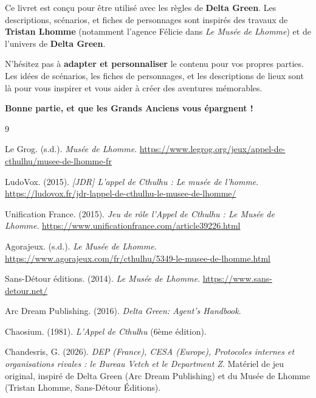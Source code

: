 \documentclass[10pt,a5paper,twoside]{book}
\begin{document}
Ce livret est conçu pour être utilisé avec les règles de \textbf{Delta Green}. Les descriptions, scénarios, et fiches de personnages sont inspirés des travaux de \textbf{Tristan Lhomme} (notamment l'agence Félicie dans \textit{Le Musée de Lhomme}) et de l'univers de \textbf{Delta Green}.

N'hésitez pas à \textbf{adapter et personnaliser} le contenu pour vos propres parties. Les idées de scénarios, les fiches de personnages, et les descriptions de lieux sont là pour vous inspirer et vous aider à créer des aventures mémorables.

\begin{shaded}
	\begin{center}
		\textbf{Bonne partie, et que les Grands Anciens vous épargnent !}
	\end{center}
\end{shaded}



\begin{thebibliography}{9}

	Le Grog. (s.d.). \textit{Musée de Lhomme}. \url{https://www.legrog.org/jeux/appel-de-cthulhu/musee-de-lhomme-fr}
	
	LudoVox. (2015). \textit{[JDR] L'appel de Cthulhu : Le musée de l'homme}. \url{https://ludovox.fr/jdr-lappel-de-cthulhu-le-musee-de-lhomme/}
	
	Unification France. (2015). \textit{Jeu de rôle l'Appel de Cthulhu : Le Musée de Lhomme}. \url{https://www.unificationfrance.com/article39226.html}
	
	Agorajeux. (s.d.). \textit{Le Musée de Lhomme}. \url{https://www.agorajeux.com/fr/cthulhu/5349-le-musee-de-lhomme.html}
	
	Sans-Détour éditions. (2014). \textit{Le Musée de Lhomme}. \url{https://www.sans-detour.net/}
	
	Arc Dream Publishing. (2016). \textit{Delta Green: Agent's Handbook}. 
	
	Chaosium. (1981). \textit{L'Appel de Cthulhu} (6ème édition).
	
	Chandesris, G. (2026). \textit{DEP (France), CESA (Europe), Protocoles internes et organisations rivales : le Bureau Vetch et le Department Z}. Matériel de jeu original, inspiré de Delta Green (Arc Dream Publishing) et du Musée de Lhomme (Tristan Lhomme, Sans-Détour Éditions).

\end{thebibliography}

\end{document}
